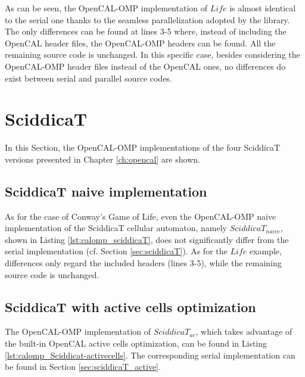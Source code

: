 As can be seen, the OpenCAL-OMP implementation of $Life$ is almost
identical to the serial one thanks to the seamless parallelization
adopted by the library. The only differences can be found at lines 3-5
where, instead of including the OpenCAL header files, the OpenCAL-OMP
headers can be found. All the remaining source code is unchanged. In
this specific case, besides considering the OpenCAL-OMP header files
instead of the OpenCAL ones, no differences do exist between serial
and parallel source codes.


\section{SciddicaT}

In this Section, the OpenCAL-OMP implementations of the four SciddicaT
versions presented in Chapter \ref{ch:opencal} are shown.

\subsection{SciddicaT naive implementation}

As for the case of Conway's Game of Life, even the OpenCAL-OMP naive
implementation of the SciddicaT cellular automaton, namely
$SciddicaT_{naive}$, shown in Listing \ref{lst:calomp_sciddicaT}, does
not significantly differ from the serial implementation (cf. Section
\ref{sec:sciddicaT}). As for the $Life$ example, differences only
regard the included headers (lines 3-5), while the remaining source
code is unchanged.



\subsection{SciddicaT with active cells optimization}
The OpenCAL-OMP implementation of $SciddicaT_{ac}$, which takes
advantage of the built-in OpenCAL active cells optimization, can be
found in Listing \ref{lst:calomp_Sciddicat-activecells}. The
corresponding serial implementation can be found in Section
\ref{sec:sciddicaT_active}.




